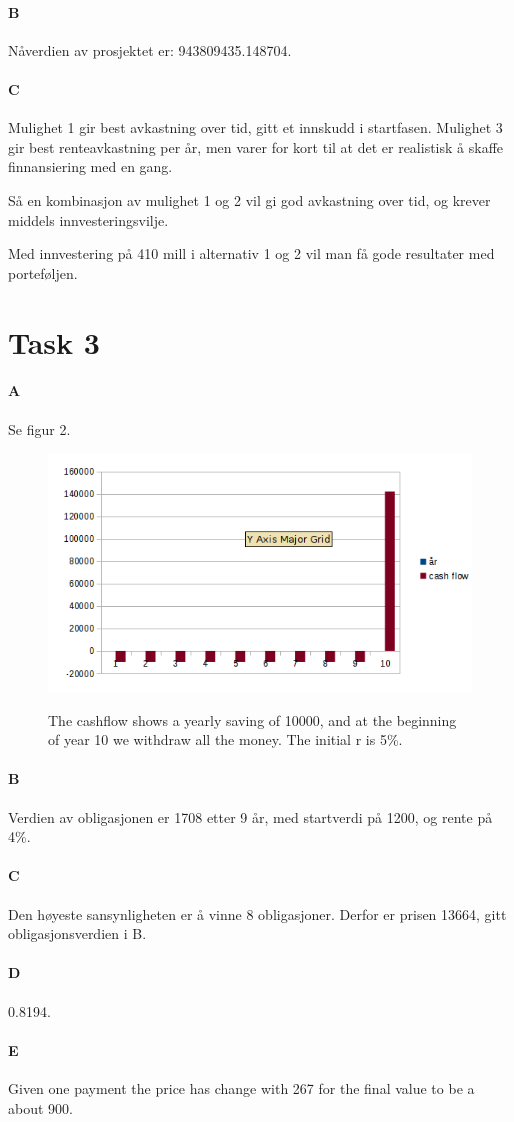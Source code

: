 \documentclass[12pt, a4paper]{article}
\begin{document}
\paragraph{B}
Nåverdien av prosjektet er: 943809435.148704.  

\paragraph{C}
Mulighet 1 gir best avkastning over tid, gitt et innskudd i startfasen. 
Mulighet 3 gir best renteavkastning per år, men varer for kort til at det er
realistisk å skaffe finnansiering med en gang. 

Så en kombinasjon av mulighet 1 og 2 vil gi god avkastning over tid, og krever
middels innvesteringsvilje. 

Med innvestering på 410 mill i alternativ 1 og 2 vil man få gode resultater med
porteføljen. 

\section{Task 3}

\paragraph{A} Se figur 2.
\begin{figure}[h]
    \centering
    \includegraphics[width=\textwidth]{cashflow} 
    \label{fig:cashflow}
    \caption{}
The cashflow shows a yearly saving of 10000, and at the beginning of year 10 we
withdraw all the money. The initial r is 5\%. 
\end{figure}

\paragraph{B}
Verdien av obligasjonen er 1708 etter 9 år, med startverdi på 1200, og rente på
4\%.

\paragraph{C}
Den høyeste sansynligheten er å vinne 8 obligasjoner. Derfor er prisen 13664,
gitt obligasjonsverdien i B.

\paragraph{D}
0.8194.

\paragraph{E}
Given one payment the price has change with 267 for the final value to be a
about 900. 
\end{document}

